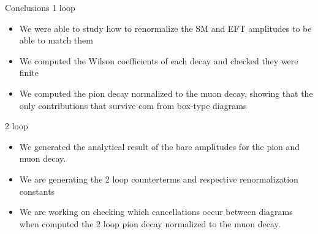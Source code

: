 \documentclass[11pt]{beamer}
\begin{document}
\begin{frame}{Conclusions}
1 loop
    \begin{itemize}
        \item We were able to study how to renormalize the SM and EFT amplitudes to be able to match them
        \item We computed the Wilson coefficients of each decay and checked they were finite
        \item We computed the pion decay normalized to the muon decay, showing that the only contributions that survive com from box-type diagrams
    \end{itemize}
2 loop

\begin{itemize}
    \item We generated the analytical result of the bare amplitudes for the pion and muon decay.
    \item We are generating the 2 loop counterterms and respective renormalization constants
    \item We are working on checking which cancellations occur between diagrams when computed the 2 loop pion decay normalized to the muon decay.
\end{itemize}
\end{frame}
\end{document}
